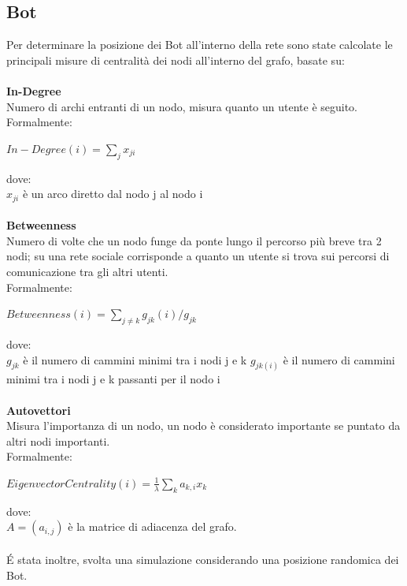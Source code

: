     \subsection{Bot}\label{Bot}
    Per determinare la posizione dei Bot all'interno della rete sono state calcolate le principali misure di centralità dei nodi all'interno del grafo, basate su:
    \\\\
    \textbf{In-Degree}
    \\
    Numero di archi entranti di un nodo, misura quanto un utente è seguito.\\
    Formalmente: \\
    \begin{center}
        $In-Degree(i) = \displaystyle\sum_{j}x_{ji}$
    \end{center}
    dove: \\
    $x_{ji}$ è un arco diretto dal nodo j al nodo i
    \\
    \\
    \textbf{Betweenness}
    \\
    Numero di volte che un nodo funge da ponte lungo il percorso più breve tra 2 nodi; su una rete sociale corrisponde a quanto un utente si trova sui percorsi di comunicazione tra gli altri utenti.\\
    Formalmente: \newline
    \begin{center}
         $Betweenness(i) = \displaystyle\sum_{j \neq k } g_{jk}(i)/g_{jk}$ 
    \end{center}
    dove: \\
    $g_{jk}$ è il numero di cammini minimi tra i nodi j e k \newline 
    $g_{jk(i)}$ è il numero di cammini minimi tra i nodi j e k passanti per il nodo i
   \\
    \\
    \textbf{Autovettori}
    \\
    Misura l'importanza di un nodo, un nodo è considerato importante se puntato da altri nodi importanti. \\
    Formalmente: \\
    \begin{center}
    $EigenvectorCentrality(i) = \frac{1}{\lambda}\displaystyle\sum_{k}a_{k,i}x_{k}$
    \end{center}
    dove: \\
    $A=(a_{i,j})$ è la matrice di adiacenza del grafo.
\\\\
    É stata inoltre, svolta una simulazione considerando una posizione randomica dei Bot.


